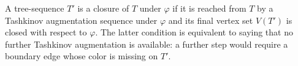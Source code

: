 \begin{definition}
A tree-sequence $T'$ is a closure of $T$ under $\varphi$ if it is reached
from $T$ by a Tashkinov augmentation sequence under $\varphi$ and its final
vertex set $V(T')$ is closed with respect to $\varphi$.  The latter
condition is equivalent to saying that no further Tashkinov augmentation is
available: a further step would require a boundary edge whose color is
missing on $T'$.
\end{definition}
